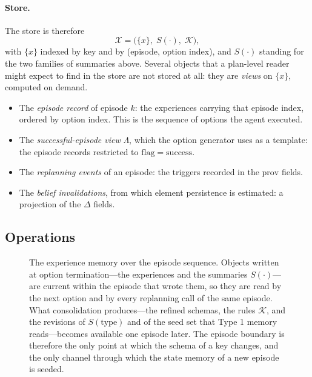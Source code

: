 \documentclass[11pt]{article}
\newcommand{\calK}{\mathcal{K}}
\newcommand{\calX}{\mathcal{X}}
\newcommand{\prov}{\mathrm{prov}}
\newcommand{\type}{\mathrm{type}}
\begin{document}
\paragraph{Store.}
The store is therefore
\begin{equation}
\calX=\big(\{x\},\;S(\cdot),\;\calK\big),
\label{eq:store2}
\end{equation}
with $\{x\}$ indexed by key and by (episode, option index), and $S(\cdot)$ standing for the two families of summaries above.
Several objects that a plan-level reader might expect to find in the store are not stored at all: they are \emph{views} on $\{x\}$, computed on demand.
\begin{itemize}[leftmargin=1.5em,itemsep=1pt]
\item The \emph{episode record} of episode $k$: the experiences carrying that episode index, ordered by option index. This is the sequence of options the agent executed.
\item The \emph{successful-episode view} $\Lambda$, which the option generator uses as a template: the episode records restricted to $\mathrm{flag}=\mathrm{success}$.
\item The \emph{replanning events} of an episode: the triggers recorded in the $\prov$ fields.
\item The \emph{belief invalidations}, from which element persistence is estimated: a projection of the $\Delta$ fields.
\end{itemize}


\subsection{Operations}
\label{sec:type2-ops}
\begin{figure}[t]
\centering

\caption{The experience memory over the episode sequence. Objects written at option termination---the experiences and the summaries $S(\cdot)$---are current within the episode that wrote them, so they are read by the next option and by every replanning call of the same episode. What consolidation produces---the refined schemas, the rules $\calK$, and the revisions of $S(\type)$ and of the seed set that Type 1 memory reads---becomes available one episode later. The episode boundary is therefore the only point at which the schema of a key changes, and the only channel through which the state memory of a new episode is seeded.}
\label{fig:lifecycle}
\end{figure}
\end{document}
